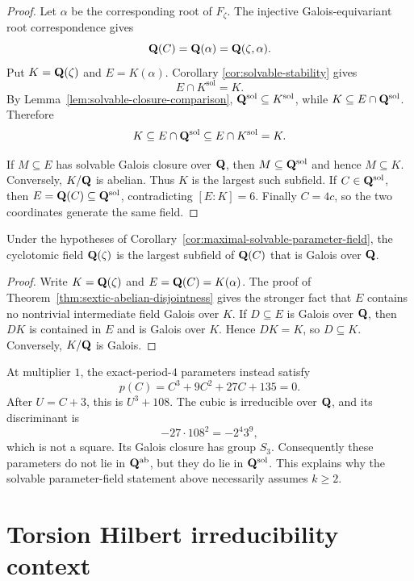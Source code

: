 \begin{proof}
Let $\alpha$ be the corresponding root of $F_\zeta$.  The injective
Galois-equivariant root correspondence gives
\[
 \mathbf Q(C)=\mathbf Q(\alpha)=\mathbf Q(\zeta,\alpha).
\]
Put $K=\mathbf Q(\zeta)$ and $E=K(\alpha)$.  Corollary
\ref{cor:solvable-stability} gives
\[
 E\cap K^{\mathrm{sol}}=K.
\]
By Lemma~\ref{lem:solvable-closure-comparison},
$\mathbf Q^{\mathrm{sol}}\subseteq K^{\mathrm{sol}}$, while
$K\subseteq E\cap\mathbf Q^{\mathrm{sol}}$.  Therefore
\[
 K\subseteq E\cap\mathbf Q^{\mathrm{sol}}
 \subseteq E\cap K^{\mathrm{sol}}=K.
\]

If $M\subseteq E$ has solvable Galois closure over $\mathbf Q$, then
$M\subseteq\mathbf Q^{\mathrm{sol}}$ and hence $M\subseteq K$.  Conversely,
$K/\mathbf Q$ is abelian.  Thus $K$ is the largest such subfield.  If
$C\in\mathbf Q^{\mathrm{sol}}$, then $E=\mathbf Q(C)\subseteq\mathbf Q^{\mathrm{sol}}$,
contradicting $[E:K]=6$.  Finally $C=4c$, so the two coordinates
generate the same field.
\end{proof}

\begin{corollary}
\label{cor:maximal-galois-parameter-field}
Under the hypotheses of
Corollary~\ref{cor:maximal-solvable-parameter-field}, the cyclotomic
field $\mathbf Q(\zeta)$ is the largest subfield of $\mathbf Q(C)$ that is Galois
over $\mathbf Q$.
\end{corollary}

\begin{proof}
Write $K=\mathbf Q(\zeta)$ and $E=\mathbf Q(C)=K(\alpha)$.  The proof of
Theorem~\ref{thm:sextic-abelian-disjointness} gives the stronger fact
that $E$ contains no nontrivial intermediate field Galois over $K$.
If $D\subseteq E$ is Galois over $\mathbf Q$, then $DK$ is contained in $E$
and is Galois over $K$.  Hence $DK=K$, so $D\subseteq K$.  Conversely,
$K/\mathbf Q$ is Galois.
\end{proof}

At multiplier $1$, the exact-period-$4$ parameters instead satisfy
\[
 p(C)=C^3+9C^2+27C+135=0.
\]
After $U=C+3$, this is $U^3+108$.  The cubic is irreducible over
$\mathbf Q$, and its discriminant is
\[
 -27\cdot108^2=-2^4 3^9,
\]
which is not a square.  Its Galois closure has group $S_3$.
Consequently these parameters do not lie in $\mathbf Q^{\mathrm{ab}}$, but
they do lie in $\mathbf Q^{\mathrm{sol}}$.  This explains why the solvable
parameter-field statement above necessarily assumes $k\ge2$.

\section{Torsion Hilbert irreducibility context}


